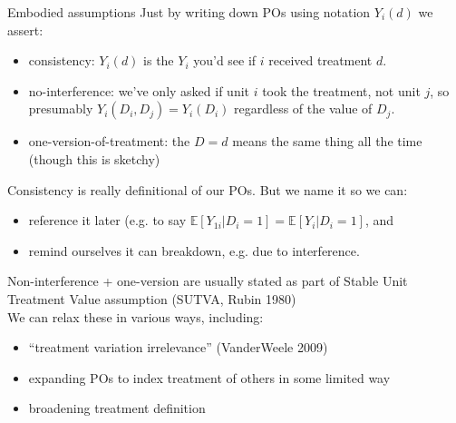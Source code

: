 \documentclass[xcolor=dvipsnames]{beamer}
\newcommand\E{\mathbb{E}}
\begin{document}
\begin{frame}{Embodied assumptions}
 Just by writing down POs using notation $Y_i(d)$ we assert:\\
\footnotesize
\begin{itemize}
\item consistency: $Y_i(d)$ is the $Y_i$ you'd see if $i$ received treatment $d$.
\item no-interference: we've only asked if unit $i$ took the treatment, not unit $j$, so presumably $Y_i(D_i,D_j)= Y_i(D_i)$ regardless of the value of $D_j$. 
\item one-version-of-treatment:  the $D=d$ means the same thing all the time (though this is sketchy)
\end{itemize}
\medskip
\small
{} Consistency is really definitional of our POs. But we name it so we can:
\footnotesize
\begin{itemize}
\item reference it later (e.g. to say $\E[Y_{1i}|D_i=1]=\E[Y_i|D_i=1]$, and
\item remind ourselves it can breakdown, e.g. due to interference.
\end{itemize}
\bigskip
\normalsize
{} Non-interference + one-version are usually stated as part of Stable Unit Treatment Value assumption (SUTVA, Rubin 1980) \\
\bigskip
{} We can relax these in various ways, including:
\footnotesize
\begin{itemize}
\item ``treatment variation irrelevance'' (VanderWeele 2009)
\item expanding POs to index treatment of others in some limited way
\item broadening treatment definition
\end{itemize}
\end{frame}
\end{document}
